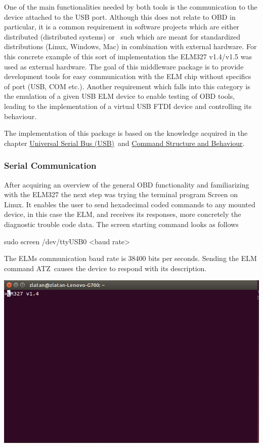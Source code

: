 {One of the main functionalities needed by both tools is the
communication to the device attached to the USB port. Although this does
not relate to OBD in particular, it is a common requirement in software
projects which are either distributed (distributed systems) or ~such
which are meant for standardized distributions (Linux, Windows, Mac) in
combination with external hardware. For this concrete example of this
sort of implementation the ELM327 v1.4/v1.5 was used as external
hardware. The goal of this middleware package is to provide development
tools for easy communication with the ELM chip without specifics of port
(USB, COM etc.). Another requirement which falls into this category is
the emulation of a given USB ELM device to enable testing of OBD tools,
leading to the implementation of a virtual USB FTDI device and
controlling its behaviour.}

{The implementation of this package is based on the knowledge acquired
in the chapter }{\protect\hyperlink{h.g52kpz9o7mut}{Universal Serial Bus
(USB)}}{~and }{\protect\hyperlink{h.sukmqmhc4ldi}{Command Structure and
Behaviour}}{.}

\hypertarget{h.8ukx9pv2y8wv}{\subsubsection{\texorpdfstring{{Serial
Communication}}{Serial Communication}}\label{h.8ukx9pv2y8wv}}

{After acquiring an overview of t}{he general OBD functionality and
familiarizing with the ELM327 the next step was trying the terminal
program Screen on Linux. It enables the user to send hexadecimal coded
commands to any mounted device, in this case the ELM, and receives its
responses, more concretely the diagnostic trouble code data. The screen
starting command looks as follows}

{sudo screen }{/}{dev}{/}{ttyUSB0 }{\textless{}}{baud
rate\textgreater{}}

{The ELMs communication baud rate is 38400 bits per seconds. Sending the
ELM command }{ATZ}{~causes the device to respond with its description.}

{\includegraphics{images/image07.png}}

